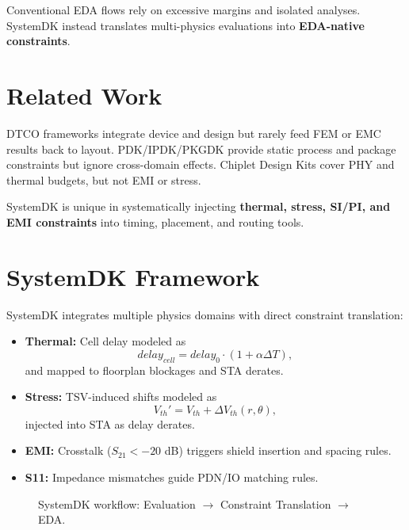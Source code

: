 \documentclass[conference]{IEEEtran}
\begin{document}
Conventional EDA flows rely on excessive margins and isolated analyses. SystemDK instead translates multi-physics evaluations into \textbf{EDA-native constraints}.

\section{Related Work}
DTCO frameworks integrate device and design but rarely feed FEM or EMC results back to layout. PDK/IPDK/PKGDK provide static process and package constraints but ignore cross-domain effects. Chiplet Design Kits cover PHY and thermal budgets, but not EMI or stress.

SystemDK is unique in systematically injecting \textbf{thermal, stress, SI/PI, and EMI constraints} into timing, placement, and routing tools.

\section{SystemDK Framework}
SystemDK integrates multiple physics domains with direct constraint translation:
\begin{itemize}
  \item \textbf{Thermal:} Cell delay modeled as
  \[
  delay_{cell} = delay_0 \cdot (1+\alpha \Delta T),
  \]
  and mapped to floorplan blockages and STA derates.
  \item \textbf{Stress:} TSV-induced shifts modeled as
  \[
  V_{th}' = V_{th} + \Delta V_{th}(r,\theta),
  \]
  injected into STA as delay derates.
  \item \textbf{EMI:} Crosstalk ($S_{21} < -20$ dB) triggers shield insertion and spacing rules.
  \item \textbf{S11:} Impedance mismatches guide PDN/IO matching rules.
\end{itemize}

\begin{figure}[htbp]
  \centering
  \caption{SystemDK workflow: Evaluation $\rightarrow$ Constraint Translation $\rightarrow$ EDA.}
  \label{fig:framework}
\end{figure}
\end{document}
